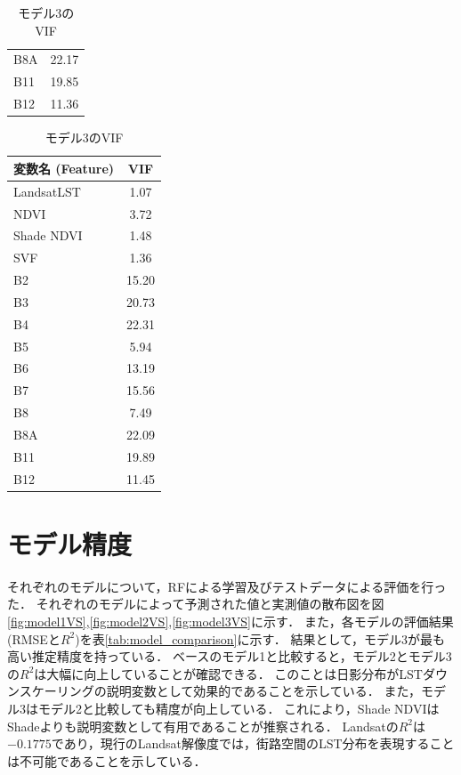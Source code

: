 \documentclass[12pt,epsf]{jreport}
\begin{document}
\begin{table}[H]
\begin{minipage}[t]{0.32\linewidth}
\begin{tabular}{lc}
            B8A & 22.17 \\
            B11 & 19.85 \\
            B12 & 11.36 \\
            \bottomrule
        \end{tabular}
    \end{minipage}
    \hfill
    \begin{minipage}[t]{0.32\linewidth}
        \centering
        \caption{モデル3のVIF}
        \label{tab:model3vif_result}
        \begin{tabular}{lc}
            \toprule
            変数名 (Feature) & VIF \\
            \midrule
            LandsatLST & 1.07 \\
            NDVI & 3.72 \\
            Shade NDVI & 1.48 \\
            SVF & 1.36 \\
            B2 & 15.20 \\
            B3 & 20.73 \\
            B4 & 22.31 \\
            B5 & 5.94 \\
            B6 & 13.19 \\
            B7 & 15.56 \\
            B8 & 7.49 \\
            B8A & 22.09 \\
            B11 & 19.89 \\
            B12 & 11.45 \\
            \bottomrule
        \end{tabular}
    \end{minipage}
\end{table}

\section{モデル精度}
それぞれのモデルについて，RFによる学習及びテストデータによる評価を行った．
それぞれのモデルによって予測された値と実測値の散布図を図\ref{fig:model1VS},\ref{fig:model2VS},\ref{fig:model3VS}に示す．
また，各モデルの評価結果(RMSEと$R^2$)を表\ref{tab:model_comparison}に示す．
結果として，モデル3が最も高い推定精度を持っている．
ベースのモデル1と比較すると，モデル2とモデル3の$R^2$は大幅に向上していることが確認できる．
このことは日影分布がLSTダウンスケーリングの説明変数として効果的であることを示している．
また，モデル3はモデル2と比較しても精度が向上している．
これにより，Shade NDVIはShadeよりも説明変数として有用であることが推察される．
Landsatの$R^2$は$-0.1775$であり，現行のLandsat解像度では，街路空間のLST分布を表現することは不可能であることを示している．
\end{document}
